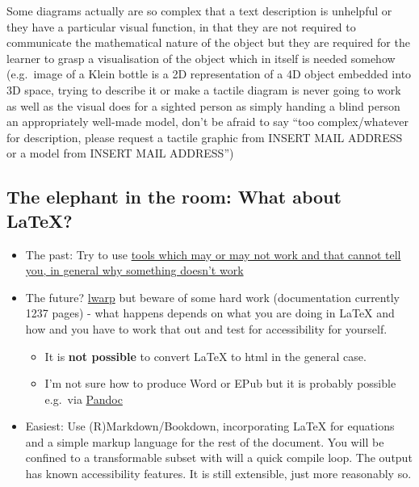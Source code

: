 \documentclass[
  17pt,
  english,
  a4paper]{extarticle}
\providecommand{\tightlist}{%
  \setlength{\itemsep}{0pt}\setlength{\parskip}{0pt}}
\theoremstyle{plain}
\theoremstyle{plain}
\theoremstyle{plain}
\theoremstyle{plain}
\theoremstyle{plain}
\theoremstyle{definition}
\theoremstyle{definition}
\theoremstyle{definition}
\theoremstyle{remark}
\renewcommand{\;}{\,}
\begin{document}
Some diagrams actually are so complex that a text description is unhelpful or they have a particular visual function, in that they are not required to communicate the mathematical nature of the object but they are required for the learner to grasp a visualisation of the object which in itself is needed somehow (e.g.~image of a Klein bottle is a 2D representation of a 4D object embedded into 3D space, trying to describe it or make a tactile diagram is never going to work as well as the visual does for a sighted person as simply handing a blind person an appropriately well-made model, don't be afraid to say ``too complex/whatever for description, please request a tactile graphic from INSERT MAIL ADDRESS or a model from INSERT MAIL ADDRESS'')

\hypertarget{the-elephant-in-the-room-what-about-latex}{%
\subsection{The elephant in the room: What about LaTeX?}\label{the-elephant-in-the-room-what-about-latex}}

\begin{itemize}
\tightlist
\item
  The past: Try to use \href{https://hub.docker.com/r/bathmash/mathaltnotes}{tools which may or may not work and that cannot tell you, in general why something doesn't work}
\item
  The future? \href{https://ctan.org/pkg/lwarp?lang=en}{lwarp} but beware of some hard work (documentation currently 1237 pages) - what happens depends on what you are doing in LaTeX and how and you have to work that out and test for accessibility for yourself.

  \begin{itemize}
  \tightlist
  \item
    It is \textbf{not possible} to convert LaTeX to html in the general case.
  \item
    I'm not sure how to produce Word or EPub but it is probably possible e.g.~via \href{https://pandoc.org/}{Pandoc}
  \end{itemize}
\item
  Easiest: Use (R)Markdown/Bookdown, incorporating LaTeX for equations and a simple markup language for the rest of the document. You will be confined to a transformable subset with will a quick compile loop. The output has known accessibility features. It is still extensible, just more reasonably so.
\end{itemize}
\end{document}
